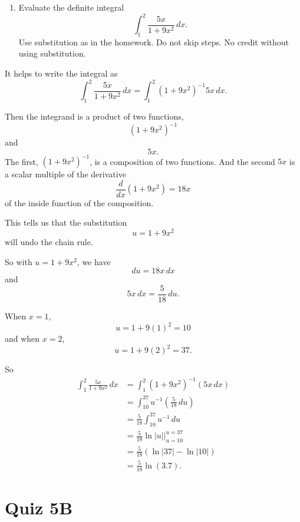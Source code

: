 \documentclass{ximera}
\begin{document}
\begin{question} \label{QOererr3rr3}
\begin{enumerate}
\item Evaluate the definite integral
\[
      \int_1^2 \frac{5x}{1+9x^2}\, dx .
\]
Use substitution as in the homework. Do not skip steps. No credit without using substitution. 

\end{enumerate}

\begin{explanation}
It helps to write the integral as
\[
  \int_1^2 \frac{5x}{1+9x^2}\, dx = \int_1^2 (1+9x^2)^{-1}5x\, dx .
\]

Then the integrand is a product of two functions,
\[
        (1+9x^2)^{-1}
\]
and
\[
    5x .
\]
The first, $(1+9x^2)^{-1}$, is a composition of two functions. And the second $5x$ is a scalar multiple of the derivative
\[
 \frac{d}{dx}\left( 1+9x^2  \right) = 18x
\]
of the inside function of the composition.

This tells us that the substitution
\[
 u = 1 + 9x^2
\]
will undo the chain rule.

So with $u=1+9x^2$,  we have
\[
    du = 18x \, dx
\]
and 
\[
     5x\, dx = \frac{5}{18} \, du.
\]

When $x=1$,
\[
      u = 1+9(1)^2 = 10
\]
and when $x=2$,
\[
     u = 1+9(2)^2 = 37.
\]

So
\begin{align*}
\int_1^2 \frac{5x}{1+9x^2}\, dx  &= \int_1^2 (1+9x^2)^{-1} (5x \, dx)  \\
                                                  &= \int_{10}^{37} u^{-1} \left(  \frac{5}{18}\, du \right) \\
                                                  &= \frac{5}{18}\int_{10}^{37} u^{-1} \, du \\
                                                  & = \frac{5}{18}\ln \left| u \right| \Big|_{u=10}^{u=37} \\
                                                  &=\frac{5}{18} \left( \ln|37| - \ln|10| \right) \\
                                                  &= \frac{5}{18} \ln \left( 3.7 \right) .
\end{align*}

\end{explanation}
\end{question}

\section{Quiz 5B}
\end{document}
